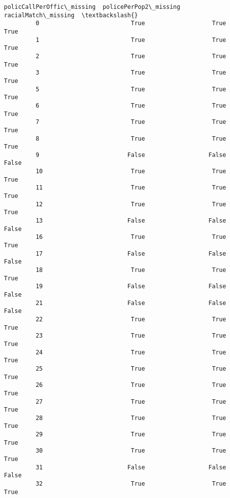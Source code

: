 \documentclass[11pt]{llncs}
\begin{document}
\begin{Verbatim}[commandchars=\\\{\}]
               policCallPerOffic\_missing  policePerPop2\_missing  racialMatch\_missing  \textbackslash{}
         0                          True                   True                 True   
         1                          True                   True                 True   
         2                          True                   True                 True   
         3                          True                   True                 True   
         5                          True                   True                 True   
         6                          True                   True                 True   
         7                          True                   True                 True   
         8                          True                   True                 True   
         9                         False                  False                False   
         10                         True                   True                 True   
         11                         True                   True                 True   
         12                         True                   True                 True   
         13                        False                  False                False   
         16                         True                   True                 True   
         17                        False                  False                False   
         18                         True                   True                 True   
         19                        False                  False                False   
         21                        False                  False                False   
         22                         True                   True                 True   
         23                         True                   True                 True   
         24                         True                   True                 True   
         25                         True                   True                 True   
         26                         True                   True                 True   
         27                         True                   True                 True   
         28                         True                   True                 True   
         29                         True                   True                 True   
         30                         True                   True                 True   
         31                        False                  False                False   
         32                         True                   True                 True   

\end{Verbatim}
\end{document}
